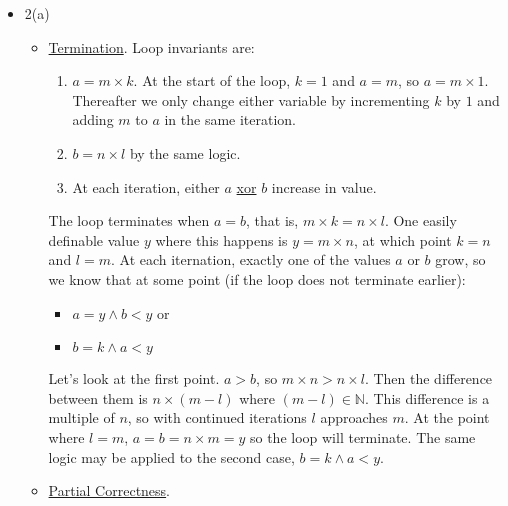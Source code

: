\documentclass{article}
\begin{document}
\begin{itemize}
\begin{description}
\begin{description}
            \end{description}
    \end{description}
\item 2(a)
    \begin{itemize}
    \item \underline{Termination}. Loop invariants are:
        \begin{enumerate}
        \item $a = m \times k$. At the start of the loop, $k = 1$ and $a = m$, so $a = m \times 1$. Thereafter we only change either variable by incrementing $k$ by $1$ and adding $m$ to $a$ in the same iteration.
        \item $b = n \times l$ by the same logic.
        \item At each iteration, either $a$ \underline{xor} $b$ increase in value.
        \end{enumerate}
    The loop terminates when $a = b$, that is, $m \times k = n \times l$. One easily definable value $y$ where this happens is $y = m \times n$, at which point $k = n$ and $l = m$. At each iternation, exactly one of the values $a$ or $b$ grow, so we know that at some point (if the loop does not terminate earlier):
        \begin{itemize}
        \item $a = y \land b < y$ or
        \item $b = k \land a < y$
        \end{itemize}
    Let's look at the first point. $a > b$, so $m \times n > n \times l$. Then the difference between them is $n \times (m - l)$ where $(m - l) \in \mathbb{N}$. This difference is a multiple of $n$, so with continued iterations $l$ approaches $m$. At the point where $l = m$, $a = b = n \times m = y$ so the loop will terminate. The same logic may be applied to the second case, $b = k \land a < y$.
    \item \underline{Partial Correctness}.
\end{itemize}
\end{itemize}
\end{document}
